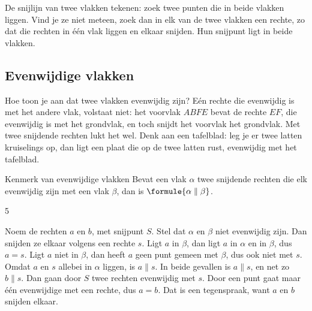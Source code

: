 \begin{werkwijze}
De snijlijn van twee vlakken tekenen: zoek twee punten die in beide vlakken liggen. Vind je ze niet meteen, zoek dan in elk van de twee vlakken een rechte, zo dat die rechten in één vlak liggen en elkaar snijden. Hun snijpunt ligt in beide vlakken.
\end{werkwijze}

\begin{oefeningen}
\end{oefeningen}

\subsection{Evenwijdige vlakken}

Hoe toon je aan dat twee vlakken evenwijdig zijn? Eén rechte die evenwijdig is met het andere vlak, volstaat niet: het voorvlak $ABFE$ bevat de rechte $EF$, die evenwijdig is met het grondvlak, en toch snijdt het voorvlak het grondvlak. Met twee snijdende rechten lukt het wel. Denk aan een tafelblad: leg je er twee latten kruiselings op, dan ligt een plaat die op de twee latten rust, evenwijdig met het tafelblad.

\begin{theorie}
\begin{stelling}{Kenmerk van evenwijdige vlakken}
Bevat een vlak $\alpha$ twee snijdende rechten die elk evenwijdig zijn met een vlak $\beta$, dan is $\formule{\alpha \parallel \beta}$.
\end{stelling}
\begin{alleenvoor}{5}
\begin{bewijs}
Noem de rechten $a$ en $b$, met snijpunt $S$. Stel dat $\alpha$ en $\beta$ niet evenwijdig zijn. Dan snijden ze elkaar volgens een rechte $s$. Ligt $a$ in $\beta$, dan ligt $a$ in $\alpha$ en in $\beta$, dus $a = s$. Ligt $a$ niet in $\beta$, dan heeft $a$ geen punt gemeen met $\beta$, dus ook niet met $s$. Omdat $a$ en $s$ allebei in $\alpha$ liggen, is $a \parallel s$. In beide gevallen is $a \parallel s$, en net zo $b \parallel s$. Dan gaan door $S$ twee rechten evenwijdig met $s$. Door een punt gaat maar één evenwijdige met een rechte, dus $a = b$. Dat is een tegenspraak, want $a$ en $b$ snijden elkaar.
\end{bewijs}
\end{alleenvoor}
\end{theorie}

